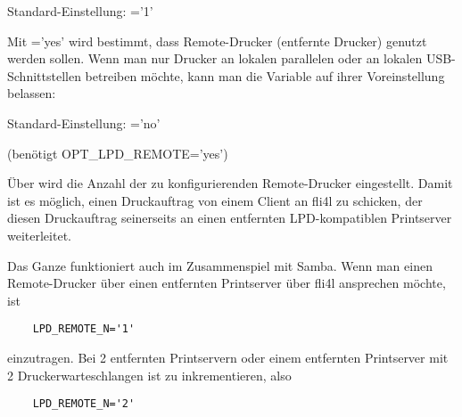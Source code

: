 \begin{description}

    Standard-Einstellung: ='1'



    Mit ='yes' wird bestimmt, dass Remote-Drucker
    (entfernte Drucker) genutzt werden sollen. Wenn man nur Drucker an lokalen
    parallelen oder an lokalen USB-Schnittstellen betreiben möchte, kann man die
    Variable auf ihrer Voreinstellung belassen:

    Standard-Einstellung: ='no'


 (benötigt OPT\_LPD\_REMOTE='yes')

    Über  wird die Anzahl der zu konfigurierenden Remote-Drucker
    eingestellt. Damit ist es möglich, einen Druckauftrag von einem Client
    an fli4l zu schicken, der diesen Druckauftrag seinerseits an einen
    entfernten LPD-kompatiblen Printserver weiterleitet.

    Das Ganze funktioniert auch im Zusammenspiel mit Samba. Wenn  man einen
    Remote-Drucker über einen entfernten Printserver über fli4l ansprechen
    möchte, ist

\begin{example}
\begin{verbatim}
    LPD_REMOTE_N='1'
\end{verbatim}
\end{example}

    einzutragen. Bei 2 entfernten Printservern oder einem entfernten
    Printserver mit 2 Druckerwarteschlangen ist  zu
    inkrementieren, also

\begin{example}
\begin{verbatim}
    LPD_REMOTE_N='2'
\end{verbatim}
\end{example}


\end{description}
